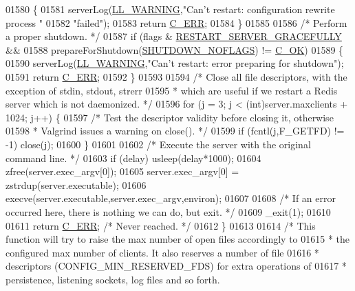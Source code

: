 \begin{DoxyCode}
{{{{{{{{{{{{{{{{01580     \{
01581         serverLog(\hyperlink{server_8h_a31229b9334bba7d6be2a72970967a14b}{LL\_WARNING},\textcolor{stringliteral}{"Can't restart: configuration rewrite process "}
01582                              \textcolor{stringliteral}{"failed"});
01583         \textcolor{keywordflow}{return} \hyperlink{server_8h_af98ac28d5f4d23d7ed5985188e6fb7d1}{C\_ERR};
01584     \}
01585 
01586     \textcolor{comment}{/* Perform a proper shutdown. */}
01587     \textcolor{keywordflow}{if} (flags & \hyperlink{server_8h_af951fdb3aa8efbce7cde83e8a31fff6a}{RESTART\_SERVER\_GRACEFULLY} &&
01588         prepareForShutdown(\hyperlink{server_8h_a077401d3a9f810d535c00725ef6c6532}{SHUTDOWN\_NOFLAGS}) != \hyperlink{server_8h_a303769ef1065076e68731584e758d3e1}{C\_OK})
01589     \{
01590         serverLog(\hyperlink{server_8h_a31229b9334bba7d6be2a72970967a14b}{LL\_WARNING},\textcolor{stringliteral}{"Can't restart: error preparing for shutdown"});
01591         \textcolor{keywordflow}{return} \hyperlink{server_8h_af98ac28d5f4d23d7ed5985188e6fb7d1}{C\_ERR};
01592     \}
01593 
01594     \textcolor{comment}{/* Close all file descriptors, with the exception of stdin, stdout, strerr}
01595 \textcolor{comment}{     * which are useful if we restart a Redis server which is not daemonized. */}
01596     \textcolor{keywordflow}{for} (j = 3; j < (\textcolor{keywordtype}{int})server.maxclients + 1024; j++) \{
01597         \textcolor{comment}{/* Test the descriptor validity before closing it, otherwise}
01598 \textcolor{comment}{         * Valgrind issues a warning on close(). */}
01599         \textcolor{keywordflow}{if} (fcntl(j,F\_GETFD) != -1) close(j);
01600     \}
01601 
01602     \textcolor{comment}{/* Execute the server with the original command line. */}
01603     \textcolor{keywordflow}{if} (delay) usleep(delay*1000);
01604     zfree(server.exec\_argv[0]);
01605     server.exec\_argv[0] = zstrdup(server.executable);
01606     execve(server.executable,server.exec\_argv,environ);
01607 
01608     \textcolor{comment}{/* If an error occurred here, there is nothing we can do, but exit. */}
01609     \_exit(1);
01610 
01611     \textcolor{keywordflow}{return} \hyperlink{server_8h_af98ac28d5f4d23d7ed5985188e6fb7d1}{C\_ERR}; \textcolor{comment}{/* Never reached. */}
01612 \}
01613 
01614 \textcolor{comment}{/* This function will try to raise the max number of open files accordingly to}
01615 \textcolor{comment}{ * the configured max number of clients. It also reserves a number of file}
01616 \textcolor{comment}{ * descriptors (CONFIG\_MIN\_RESERVED\_FDS) for extra operations of}
01617 \textcolor{comment}{ * persistence, listening sockets, log files and so forth.}
}}}}}}}}}}}}}}}}
\end{DoxyCode}
